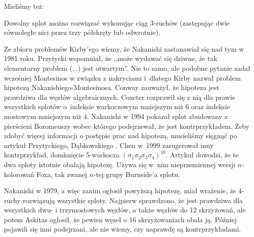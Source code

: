 Mieliśmy też:

\begin{conjecture}
    Dowolny splot można rozwiązać wykonując ciąg 3-ruchów (zastępując dwie równoległe nici przez trzy półskręty lub odwrotnie).
\end{conjecture}

Ze zbioru problemów Kirby'ego \cite{kirby1978} wiemy, że Nakanishi zastanawiał się nad tym w 1981 roku.
%
Przytycki \cite[s. 199]{przytycki1995} wspomniał, że ,,może wydawać się dziwne, że tak elementarny problem (...) jest otwartym''.
Nie to samo, ale podobne pytanie zadał wcześniej Montesinos w związku z nakryciami i~dlatego Kirby nazwał problem hipotezą Nakanishiego-Montesinosa.
%
Conway zauważył, że hipoteza jest prawdziwa dla węzłów algebraicznych.
%
Coxeter rozprawił się z nią dla prawie wszystkich splotów o~indeksie warkoczowym mniejszym niż $6$ oraz indeksie mostowym mniejszym niż $4$.
%
Nakanishi w 1994 pokazał splot zbudowany z pierścieni Boromeuszy wobec którego podejrzewał, że jest kontrprzykładem.
%
Żeby zdobyć więcej informacji o postępie prac nad hipotezą, musieliśmy sięgnąć po artykuł Przytyckiego, Dąbkowskiego \cite{dabkowski2002}.
%
%
Chen w~1999 zasugerował inny kontrprzykład, domknięcie 5-warkocza $(\sigma_1\sigma_2\sigma_3\sigma_4)^{10}$.
%
Artykuł \cite{dabkowski2002} dowodzi, że te dwa sploty istotnie obalają hipotezę.
Używa się w~nim nieprzemiennej wersji $n$-kolorowań Foxa, tak zwanej $n$-tej grupy Burnside'a splotu.
%
%

Nakanishi w 1979, a więc zanim ogłosił powyższą hipotezę, miał wrażenie, że $4$-ruchy rozwiązują wszystkie sploty.
Najpierw sprawdzono, że jest prawdziwa dla wszystkich dwu- i trzymostowych węzłów, a także węzłów do 12 skrzyżowań, ale potem Askitas ogłosił, że pewien węzeł o 16 skrzyżowaniach obala ją.
%
Później pojawili się inni podejrzani, ale nie wiemy, czy naprawdę są kontrprzykładami.


%


